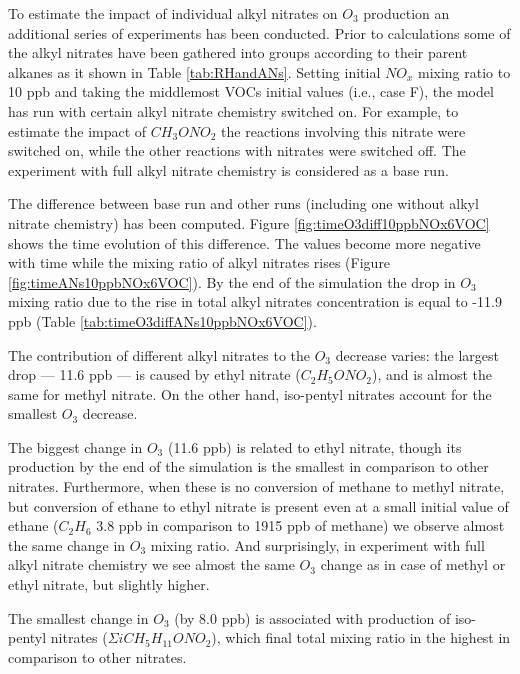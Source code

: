 \documentclass[11pt,a4paper]{article}
\begin{document}
To estimate the impact of individual alkyl nitrates on $O_3$ production an additional series of experiments has been conducted. Prior to calculations some of the alkyl nitrates have been gathered into groups according to their parent alkanes as it shown in Table \ref{tab:RHandANs}. Setting initial $NO_x$ mixing ratio to 10 ppb and taking the middlemost VOCs initial values (i.e., case F), the model has run with certain alkyl nitrate chemistry switched on. For example, to estimate the impact of $CH_3ONO_2$ the reactions involving this nitrate were switched on, while the other reactions with nitrates were switched off. The experiment with full alkyl nitrate chemistry is considered as a base run.

The difference between base run and other runs (including one without alkyl nitrate chemistry) has been computed. Figure \ref{fig:timeO3diff10ppbNOx6VOC} shows the time evolution of this difference. The values become more negative with time while the mixing ratio of alkyl nitrates rises (Figure \ref{fig:timeANs10ppbNOx6VOC}). By the end of the simulation the drop in $O_3$ mixing ratio due to the rise in total alkyl nitrates concentration is equal to -11.9 ppb (Table \ref{tab:timeO3diffANs10ppbNOx6VOC}). %

The contribution of different alkyl nitrates to the $O_3$ decrease varies: the largest drop --- 11.6 ppb --- is caused by ethyl nitrate ($C_2H_5ONO_2$), and is almost the same for methyl nitrate. On the other hand, iso-pentyl nitrates account for the smallest $O_3$ decrease.

The biggest change in $O_3$ (11.6 ppb) is related to ethyl nitrate, though its production by the end of the simulation is the smallest in comparison to other nitrates. Furthermore, when these is no conversion of methane to methyl nitrate, but conversion of ethane to ethyl nitrate is present even at a small initial value of ethane ($C_2H_6$ 3.8 ppb in comparison to 1915 ppb of methane) we observe almost the same change in $O_3$ mixing ratio. And surprisingly, in experiment with full alkyl nitrate chemistry we see almost the same $O_3$ change as in case of methyl or ethyl nitrate, but slightly higher.

The smallest change in $O_3$ (by 8.0 ppb) is associated with production of iso-pentyl nitrates ($\Sigma iCH_5H_{11}ONO_2$), which final total mixing ratio in the highest in comparison to other nitrates.
\end{document}
